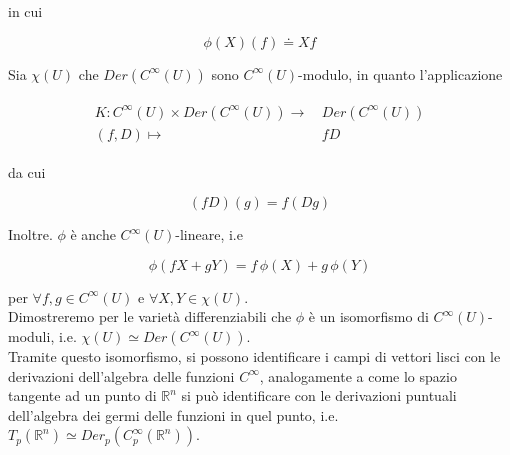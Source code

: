 in cui

\begin{equation}
	\phi(X) (f) \doteq X f
\end{equation}

Sia $ \chi(U) $ che $ Der(C^{\infty}(U)) $ sono $ C^{\infty}(U) $-modulo, in quanto l'applicazione

\begin{align}
	\begin{split}
		K : C^{\infty}(U) \times Der(C^{\infty}(U)) \to& \, Der(C^{\infty}(U))\\
		(f,D) \mapsto& \, f D
	\end{split}
\end{align}

da cui

\begin{equation}
	(f D) (g) = f (D g)
\end{equation}

Inoltre. $ \phi $ è anche $ C^{\infty}(U) $-lineare, i.e

\begin{equation}
	\phi(f X + g Y) = f \, \phi(X) + g \, \phi(Y)
\end{equation}

per $ \forall f,g \in C^{\infty}(U) $ e $ \forall X,Y \in \chi(U) $.\\
Dimostreremo per le varietà differenziabili che $ \phi $ è un isomorfismo di $ C^{\infty}(U) $-moduli, i.e. $ \chi(U) \simeq Der(C^{\infty}(U)) $.\\
Tramite questo isomorfismo, si possono identificare i campi di vettori lisci con le derivazioni dell'algebra delle funzioni $ C^{\infty} $, analogamente a come lo spazio tangente ad un punto di $ \mathbb{R}^{n} $ si può identificare con le derivazioni puntuali dell'algebra dei germi delle funzioni in quel punto, i.e. $ T_{p}(\mathbb{R}^{n}) \simeq Der_{p}(C_{p}^{\infty}(\mathbb{R}^{n})) $.